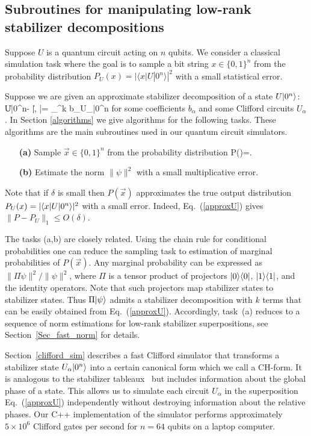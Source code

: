 \subsection{Subroutines for manipulating low-rank stabilizer decompositions}
\label{sec:subroutines}
Suppose $U$ is a quantum circuit acting on $n$ qubits.
We consider a classical simulation task where the goal is to
sample a bit string $x\in \{0,1\}^n$ from the probability
distribution $P_U(x)=|\langle x|U|0^n\rangle|^2$ with a small statistical error. 

Suppose we are given an approximate stabilizer decomposition of a state $U\vert0^n\rangle$:
\be
\label{approxU}
\|U|0^n\ra - |\psi\ra\|\le \delta, \qquad |\psi\ra = \sum_{}^k b_\alpha U_\alpha |0^n\ra
\ee
for some coefficients $b_\alpha$ and some Clifford circuits $U_\alpha$. In Section \ref{algorithms} we give algorithms for the following tasks. These algorithms are the main subroutines used in our quantum circuit simulators.
\begin{enumerate}
\item[\bf (a)] Sample $\vec{x}\in \{0,1\}^n$ from the probability distribution
\be
\label{P(x)normalized}
P()=.
\ee
\item[\bf (b)] Estimate the norm $\|\psi\|^2$ with a small multiplicative error.
\end{enumerate}
Note that if $\delta$ is small then $P(\vec{x})$ approximates the true  output distribution $P_U({x})=|\langle {x}|U|0^n\rangle|^2$ with a small error. Indeed, Eq.~(\ref{approxU}) gives $\| P - P_U\|_1 \le O(\delta)$.

The tasks (a,b)  are closely related. Using the chain rule for conditional probabilities
one can  reduce the sampling task 
to estimation of marginal probabilities of $P(\vec{x})$.
Any marginal probability can be expressed 
as  $\| \Pi \psi \|^2/\|\psi\|^2$, where $\Pi$
is a tensor product of projectors $|0\rangle\langle 0|$, $|1\rangle\langle 1|$, and the identity operators. Note that such projectors map stabilizer states to stabilizer states.
Thus $\Pi |\psi\rangle$ admits a stabilizer decomposition with $k$ terms 
that can be easily obtained from Eq.~(\ref{approxU}).
Accordingly, 
task~(a) reduces to a sequence of norm estimations for low-rank stabilizer superpositions,
see Section~\ref{Sec_fast_norm} for details.

Section~\ref{clifford_sim} describes a fast Clifford simulator that transforms a
stabilizer state $U_\alpha|0^n\rangle$ 
into a certain canonical form 
which we call a CH-form. 
It is analogous to the stabilizer
tableaux~\cite{aaronson04improved} but includes information about the global phase of a state. 
This allows us to simulate each circuit $U_\alpha$ 
in the superposition Eq.~(\ref{approxU})
independently without destroying information about 
the relative phases.  Our C++ implementation of the simulator
performs approximately $5\times 10^6$ Clifford gates per second
for $n=64$ qubits on a laptop computer.

